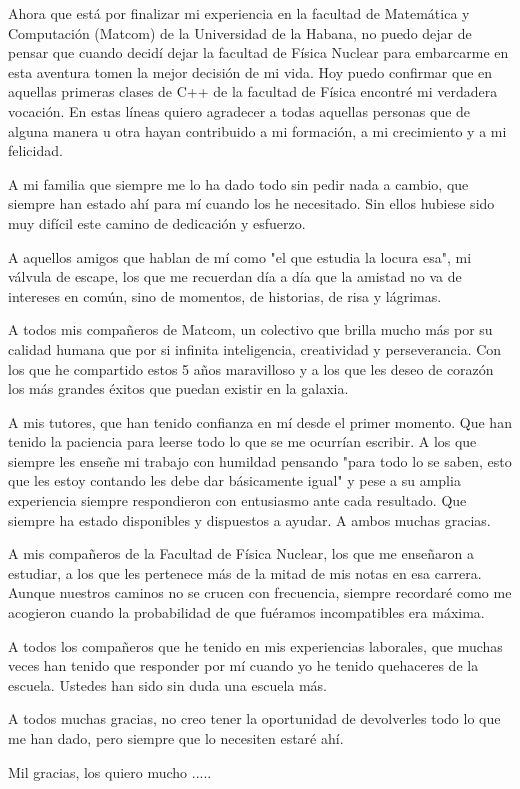 \begin{acknowledgements}
    Ahora que está por finalizar mi experiencia en la facultad de Matemática y Computación (Matcom) 
    de la Universidad de la Habana, no puedo dejar de pensar que cuando decidí dejar la facultad de 
    Física Nuclear para embarcarme en esta aventura tomen la mejor decisión de mi vida. Hoy puedo 
    confirmar que en aquellas primeras clases de C++ de la facultad de Física encontré mi verdadera 
    vocación. En estas líneas quiero agradecer a todas aquellas personas que de alguna manera u otra 
    hayan contribuido a mi formación, a mi crecimiento y a mi felicidad.
    
    A mi familia que siempre me lo ha dado todo sin pedir nada a cambio, que siempre han estado ahí
    para mí cuando los he necesitado. Sin ellos hubiese sido muy difícil este camino de dedicación y 
    esfuerzo.
    
    A aquellos amigos que hablan de mí como "el que estudia la locura esa", mi válvula de escape, 
    los que me recuerdan día a día que la amistad no va de intereses en común, sino de momentos, de 
    historias, de risa y lágrimas.

    A todos mis compañeros de Matcom, un colectivo que brilla mucho más por su calidad humana que por 
    si infinita inteligencia, creatividad y perseverancia. Con los que he compartido estos 5 años 
    maravilloso y a los que les deseo de corazón los más grandes éxitos que puedan existir en 
    la galaxia.

    A mis tutores, que han tenido confianza en mí desde el primer momento. Que han tenido la paciencia
    para leerse todo lo que se me ocurrían escribir. A los que siempre les enseñe mi trabajo con 
    humildad pensando "para todo lo se saben, esto que les estoy contando les debe dar básicamente 
    igual" y pese a su amplia experiencia siempre respondieron con entusiasmo ante cada resultado. 
    Que siempre ha estado disponibles y dispuestos a ayudar. A ambos muchas gracias.

    A mis compañeros de la Facultad de Física Nuclear, los que me enseñaron a estudiar, a los que les
    pertenece más de la mitad de mis notas en esa carrera. Aunque nuestros caminos no se crucen con 
    frecuencia, siempre recordaré como me acogieron cuando la probabilidad de que fuéramos incompatibles 
    era máxima.

    A todos los compañeros que he tenido en mis experiencias laborales, que muchas veces han tenido que 
    responder por mí cuando yo he tenido quehaceres de la escuela. Ustedes han sido sin duda una escuela 
    más.

    A todos muchas gracias, no creo tener la oportunidad de devolverles todo lo que me han dado, pero 
    siempre que lo necesiten estaré ahí.
    
    Mil gracias, los quiero mucho .....
\end{acknowledgements}